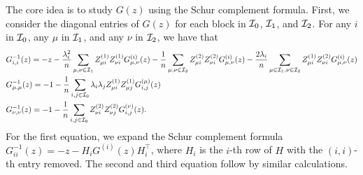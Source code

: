 The core idea is to study $G(z)$ using the Schur complement formula.
First, we consider the diagonal entries of $G(z)$ for each block in $\cal I_0$, $\cal I_1$, and $\cal I_2$.
For any $i$ in $\cal I_0$, any $\mu$ in $\cal I_1$, and any $\nu$ in $\cal I_2$, we have that
\begin{align*}
	&G_{i,i}^{-1}(z) = -z - \frac{\lambda_i^2}{n} \sum_{\mu,\nu\in \mathcal I_1} Z^{(1)}_{\mu i}Z^{(1)}_{\nu i}G^{\left( i \right)}_{\mu,\nu}(z) - \frac{1}{n} \sum_{\mu,\nu\in \mathcal I_2} Z^{(2)}_{\mu i}Z^{(2)}_{\nu i} G^{\left( i \right)}_{\mu,\nu}(z) -\frac{2\lambda_i}{n} \sum_{\mu\in \cal I_1,\nu\in \mathcal I_2} Z^{(1)}_{\mu i}Z^{(2)}_{\nu i}G^{\left( i \right)}_{\mu,\nu}(z) \\
	&G_{\mu,\mu}^{-1}(z) =  - 1 - \frac{1}{n} \sum_{i,j\in \mathcal I_0}\lambda_i \lambda_j Z^{(1)}_{\mu i}Z^{(1)}_{\mu j} G^{\left(\mu\right)}_{i,j}(z) \\
	&G_{\nu,\nu}^{-1}(z) =  - 1 - \frac{1}{n} \sum_{i,j\in \mathcal I_0}  Z^{(2)}_{\nu i}Z^{(2)}_{\nu j}  G^{\left(\nu\right)}_{i,j}(z).
\end{align*}
For the first equation, we expand the Schur complement formula $G_{ii}^{-1}(z) = -z - H_i G^{(i)}(z) H_{i}^\top$, where $H_i$ is the $i$-th row of $H$ with the $(i,i)$-th entry removed.
The second and third equation follow by similar calculations.


